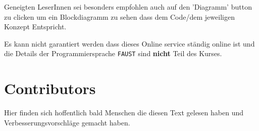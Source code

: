 Geneigten LeserInnen sei besonders empfohlen auch auf den 'Diagramm' button zu clicken um ein Blockdiagramm zu sehen dass dem Code/dem jeweiligen Konzept Entspricht.

Es kann nicht garantiert werden dass dieses Online service ständig online ist und die Details der Programmiersprache \texttt{FAUST} sind \textbf{nicht} Teil des Kurses.


\section*{Contributors}
Hier finden sich hoffentlich bald Menschen die diesen Text gelesen haben und Verbesserungsvorschläge gemacht haben.

